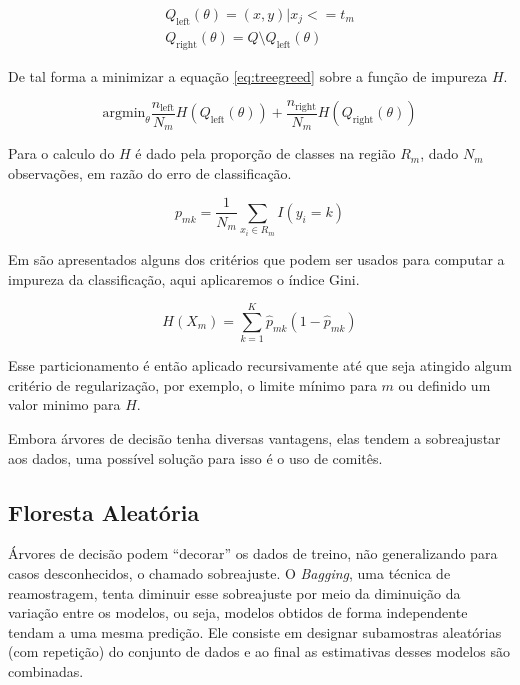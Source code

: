 \begin{equation}
        \begin{aligned}
            Q_{\text{left}}(\theta) = {(x, y) | x_j <= t_m}\\
            Q_{\text{right}}(\theta) = Q \setminus Q_{\text{left}}(\theta)
        \end{aligned}
    \label{eq:splitc}
\end{equation}

De tal forma a minimizar a equação \ref{eq:treegreed} sobre a função de
impureza $H$.

\begin{equation}
    \text{argmin}_{\theta} \frac{n_{\text{left}}}{N_m} H(Q_{\text{left}}(\theta)) +
    \frac{n_{\text{right}}}{N_m} H(Q_{\text{right}}(\theta))
    \label{eq:treegreed}
\end{equation}

Para o calculo do $H$ é dado pela proporção de classes na região $R_m$,
dado $N_m$ observações, em razão do erro de classificação.

\begin{equation}
    p_{mk} = \frac{1}{N_m} \sum_{x_i \in R_m} I(y_i = k)
\end{equation}

Em \cite{friedman2001elements} são apresentados alguns dos critérios que podem
ser usados para computar a impureza da classificação, aqui aplicaremos o índice
Gini.

\begin{equation}
    H(X_m) = \sum_{k=1}^{K} \hat{p}_{mk}(1 - \hat{p}_{mk})
    \label{eq:gini}
\end{equation}

Esse particionamento é então aplicado recursivamente até que seja atingido
algum critério de regularização, por exemplo, o limite mínimo para $m$ ou
definido um valor minimo para $H$.

Embora árvores de decisão tenha diversas vantagens, elas tendem a sobreajustar
aos dados, uma possível solução para isso é o uso de comitês.

\subsection{Floresta Aleatória}

Árvores de decisão podem ``decorar'' os dados de treino, não generalizando para
casos desconhecidos, o chamado sobreajuste. O \textit{Bagging}, uma técnica de
reamostragem, tenta diminuir esse sobreajuste por meio da diminuição da
variação entre os modelos, ou seja, modelos obtidos de forma independente
tendam a uma mesma predição. Ele consiste em designar subamostras aleatórias
(com repetição) do conjunto de dados e ao final as estimativas desses modelos
são combinadas.

